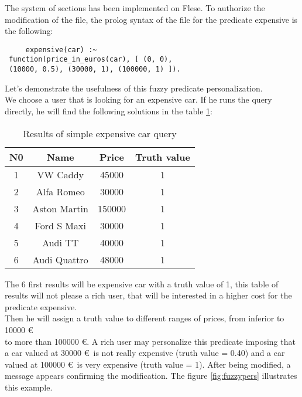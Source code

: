 \documentclass[a4paper,twoside]{article}
\begin{document}
The system of sections has been implemented on Flese. 
To authorize the modification of the file, the prolog syntax of the file for the predicate expensive is the following:

\begin{small}
\begin{verbatim}
     expensive(car) :~
 function(price_in_euros(car), [ (0, 0),
 (10000, 0.5), (30000, 1), (100000, 1) ]).
\end{verbatim}
\end{small}

Let's demonstrate the usefulness of this fuzzy predicate personalization. \\
 We choose a user that is looking for an expensive car. If he runs the query directly, he will find the following solutions in the table \ref{tab:simpleQuery1}: \\

\begin{table}[h]
\caption{Results of simple expensive car query}\label{tab:simpleQuery1} \centering
\begin{tabular}{|c|c|c|c|}
  \hline
  N0 & Name & Price & Truth value\\
  \hline
  1 & VW Caddy & 45000 & 1\\
  \hline
  2 & Alfa Romeo & 30000 & 1 \\
  \hline
  3 & Aston Martin & 150000 & 1 \\
  \hline
  4 & Ford S Maxi & 30000 & 1 \\
  \hline
  5 & Audi TT & 40000 & 1 \\
  \hline
  6 & Audi Quattro & 48000 & 1 \\ 
  \hline
\end{tabular}
\end{table}

The 6 first results will be expensive car with a truth value of 1, this table of results will not please a rich user, that will be interested in a higher cost for the predicate expensive. \\

Then he will assign a truth value to different ranges of prices, from inferior to 10000 \euro\\  to more than 100000 \euro . A rich user may personalize this predicate imposing that a car valued at 30000 \euro\  is not really expensive (truth value = 0.40) and a car valued at 100000 \euro\  is very expensive (truth value = 1). After being modified, a message appears confirming the modification. The figure \ref{fig:fuzzypers} illustrates this example. \\
\end{document}
